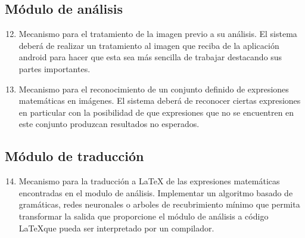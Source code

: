     \subsection{Módulo de análisis}
    \begin{enumerate}[label=RF\arabic*.]
    	\setcounter{enumi}{11}
    	\item Mecanismo para el tratamiento de la imagen previo a su análisis. El sistema deberá de realizar un tratamiento al imagen que reciba de la aplicación android para hacer que esta sea más sencilla de trabajar destacando sus partes importantes.
    	\item Mecanismo para el reconocimiento de un conjunto definido de expresiones matemáticas en imágenes. El sistema deberá de reconocer ciertas expresiones en particular con la posibilidad de que expresiones que no se encuentren en este conjunto produzcan resultados no esperados.
    \end{enumerate}
    
    \subsection{Módulo de traducción}
    \begin{enumerate}[label=RF\arabic*.]
    	\setcounter{enumi}{13}
    	\item Mecanismo para la traducción a \LaTeX{} de las expresiones matemáticas encontradas en el modulo de análisis. Implementar un algoritmo basado de gramáticas, redes neuronales o arboles de recubrimiento mínimo que permita transformar la salida que proporcione el módulo de análisis a código \LaTeX que pueda ser interpretado por un compilador.
    \end{enumerate}
    
